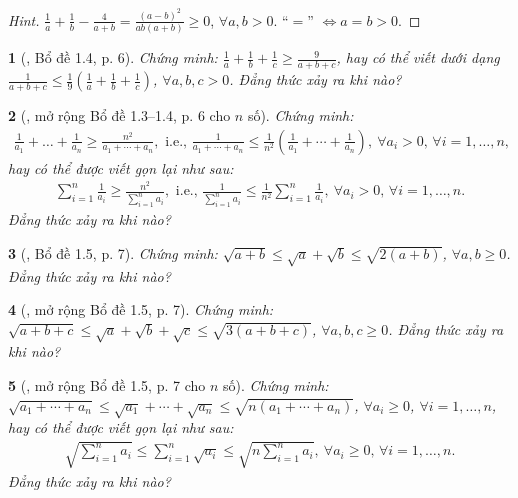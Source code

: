 \documentclass{article}
\newtheorem{baitoan}{}
\begin{document}
\begin{proof}[Hint]
	$\frac{1}{a} + \frac{1}{b} - \frac{4}{a + b} = \frac{(a - b)^2}{ab(a + b)}\ge 0$, $\forall a,b > 0$. ``$=$'' $\Leftrightarrow a = b > 0$.
\end{proof}

\begin{baitoan}[\cite{Son_Nghiep_Trung_Can_bdt}, Bổ đề 1.4, p. 6]
	Chứng minh: $\frac{1}{a} + \frac{1}{b} + \frac{1}{c}\ge\frac{9}{a + b + c}$, hay có thể viết dưới dạng $\frac{1}{a + b + c}\le\frac{1}{9}\left(\frac{1}{a} + \frac{1}{b} + \frac{1}{c}\right)$, $\forall a,b,c > 0$. Đẳng thức xảy ra khi nào?
\end{baitoan}

\begin{baitoan}[\cite{Son_Nghiep_Trung_Can_bdt}, mở rộng Bổ đề 1.3--1.4, p. 6 cho $n$ số]
	Chứng minh:
	\begin{align*}
		\frac{1}{a_1} + \ldots + \frac{1}{a_n}\ge\frac{n^2}{a_1 + \cdots + a_n},\mbox{ i.e., }\frac{1}{a_1 + \cdots + a_n}\le\frac{1}{n^2}\left(\frac{1}{a_1} + \cdots + \frac{1}{a_n}\right),\ \forall a_i > 0,\,\forall i = 1,\ldots,n,
	\end{align*}
	hay có thể được viết gọn lại như sau:
	\begin{align*}
		\sum_{i=1}^{n} \frac{1}{a_i}\ge\frac{n^2}{\sum_{i=1}^n a_i},\mbox{ i.e., }\frac{1}{\sum_{i=1}^n a_i}\le\frac{1}{n^2}\sum_{i=1}^n \frac{1}{a_i},\ \forall a_i > 0,\,\forall i = 1,\ldots,n.
	\end{align*}
	Đẳng thức xảy ra khi nào?
\end{baitoan}

\begin{baitoan}[\cite{Son_Nghiep_Trung_Can_bdt}, Bổ đề 1.5, p. 7]
	Chứng minh: $\sqrt{a + b}\le\sqrt{a} + \sqrt{b}\le\sqrt{2(a + b)}$, $\forall a,b\ge 0$. Đẳng thức xảy ra khi nào?
\end{baitoan}

\begin{baitoan}[\cite{Son_Nghiep_Trung_Can_bdt}, mở rộng Bổ đề 1.5, p. 7]
	Chứng minh: $\sqrt{a + b + c}\le\sqrt{a} + \sqrt{b} + \sqrt{c}\le\sqrt{3(a + b + c)}$, $\forall a,b,c\ge 0$. Đẳng thức xảy ra khi nào?
\end{baitoan}

\begin{baitoan}[\cite{Son_Nghiep_Trung_Can_bdt}, mở rộng Bổ đề 1.5, p. 7 cho $n$ số]
	Chứng minh: $\sqrt{a_1 + \cdots + a_n}\le\sqrt{a_1} + \cdots + \sqrt{a_n}\le\sqrt{n(a_1 + \cdots + a_n)}$, $\forall a_i\ge 0$, $\forall i = 1,\ldots,n$, hay có thể được viết gọn lại như sau:
	\begin{align*}
		\sqrt{\sum_{i=1}^n a_i}\le\sum_{i=1}^n \sqrt{a_i}\le\sqrt{n\sum_{i=1}^n a_i},\ \forall a_i\ge 0,\,\forall i = 1,\ldots,n.
	\end{align*}
	Đẳng thức xảy ra khi nào?
\end{baitoan}
\end{document}
